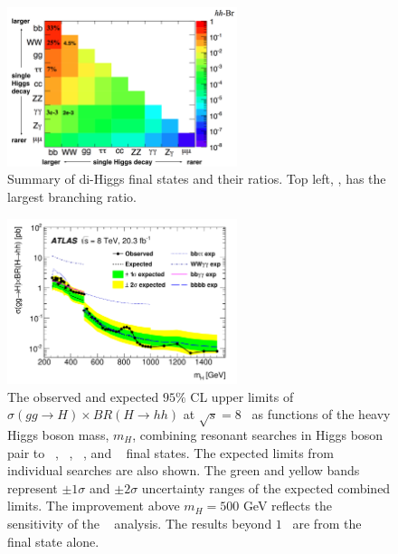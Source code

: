 \begin{figure}[htbp!]
  \centering
  \includegraphics[width=0.6\textwidth]{figures/theory/HH_BR}
  \caption{Summary of di-Higgs final states and their ratios. Top left, \bbbb, has the largest branching ratio.}
  \label{fig:HH_BR}
\end{figure}

\begin{figure}[htbp!]
  \centering
  \includegraphics[width=0.6\textwidth]{figures/theory/Run1_ATLAS}
  \caption{The observed and expected $95\%$ CL upper limits of $\sigma(gg \to H) \times BR(H \to hh)$ at $\sqrt{s}=8$\TeV~ as functions of the heavy Higgs boson mass, $m_{H}$, combining resonant searches in Higgs boson pair to \bbtautau~, \WWgg~, \bbgg~, and \bbbb~ final states. The expected limits from individual searches are also shown. The green and yellow bands represent $\pm 1\sigma$ and $\pm 2\sigma$ uncertainty ranges of the expected combined limits. The improvement above $m_{H} =500$ GeV reflects the sensitivity of the \bbbb~ analysis. The results beyond $1$\TeV~ are from the \bbbb~ final state alone.}
  \label{fig:Run1_ATLAS}
\end{figure}

